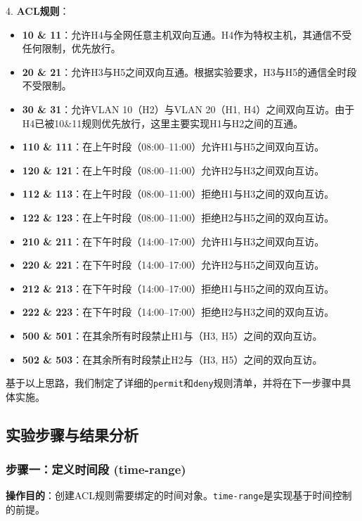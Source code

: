 \documentclass[12pt, a4paper]{article}
\begin{document}
4. \textbf{ACL规则}：
    \begin{itemize}
        \item \textbf{10 \& 11}：允许H4与全网任意主机双向互通。H4作为特权主机，其通信不受任何限制，优先放行。
        \item \textbf{20 \& 21}：允许H3与H5之间双向互通。根据实验要求，H3与H5的通信全时段不受限制。
        \item \textbf{30 \& 31}：允许VLAN 10（H2）与VLAN 20（H1, H4）之间双向互访。由于H4已被10\&11规则优先放行，这里主要实现H1与H2之间的互通。
        \item \textbf{110 \& 111}：在上午时段（08:00--11:00）允许H1与H5之间双向互访。
        \item \textbf{120 \& 121}：在上午时段（08:00--11:00）允许H2与H3之间双向互访。
        \item \textbf{112 \& 113}：在上午时段（08:00--11:00）拒绝H1与H3之间的双向互访。
        \item \textbf{122 \& 123}：在上午时段（08:00--11:00）拒绝H2与H5之间的双向互访。
        \item \textbf{210 \& 211}：在下午时段（14:00--17:00）允许H1与H3之间双向互访。
        \item \textbf{220 \& 221}：在下午时段（14:00--17:00）允许H2与H5之间双向互访。
        \item \textbf{212 \& 213}：在下午时段（14:00--17:00）拒绝H1与H5之间的双向互访。
        \item \textbf{222 \& 223}：在下午时段（14:00--17:00）拒绝H2与H3之间的双向互访。
        \item \textbf{500 \& 501}：在其余所有时段禁止H1与（H3, H5）之间的双向互访。
        \item \textbf{502 \& 503}：在其余所有时段禁止H2与（H3, H5）之间的双向互访。
    \end{itemize}
    
基于以上思路，我们制定了详细的\texttt{permit}和\texttt{deny}规则清单，并将在下一步骤中具体实施。

\subsection{实验步骤与结果分析}

\subsubsection{步骤一：定义时间段 (time-range)}

\textbf{操作目的}：创建ACL规则需要绑定的时间对象。\texttt{time-range}是实现基于时间控制的前提。
\end{document}
